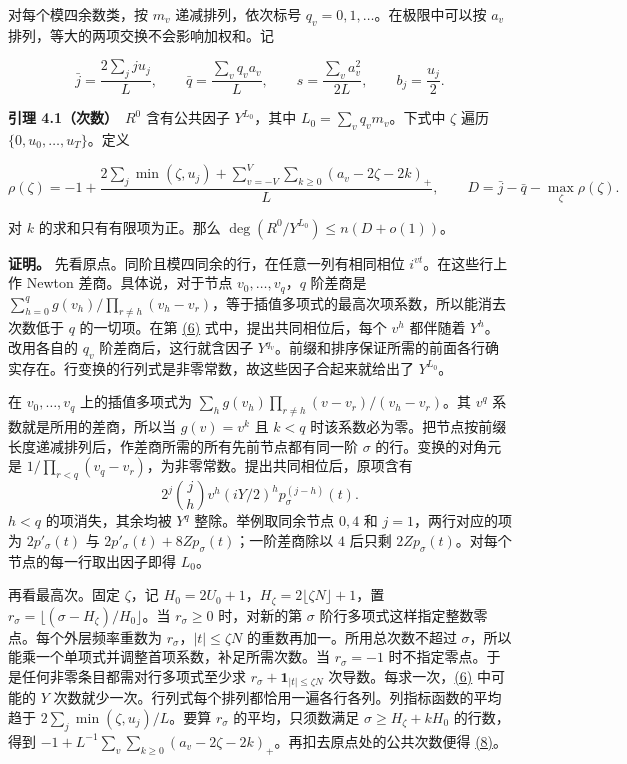 \documentclass[11pt,a4paper]{article}
\begin{document}
对每个模四余数类，按 \(m_v\) 递减排列，依次标号 \(q_v=0,1,\ldots\)。在极限中可以按 \(a_v\) 排列，等大的两项交换不会影响加权和。记

\[
 \bar j=\frac{2\sum_j ju_j}{L},\qquad \bar q=\frac{\sum_v q_va_v}{L},
 \qquad s=\frac{\sum_v a_v^2}{2L},\qquad b_j=\frac{u_j}{2}.                \tag{7}\label{eq:7}
\]

\textbf{引理 4.1（次数）}　\(R^0\) 含有公共因子 \(Y^{L_0}\)，其中 \(L_0=\sum_vq_vm_v\)。下式中 \(\zeta\) 遍历 \(\{0,u_0,\ldots,u_T\}\)。定义

\[
 \rho(\zeta)=-1+\frac{2\sum_j\min(\zeta,u_j)+
                   \sum_{v=-V}^{V}\sum_{k\ge0}(a_v-2\zeta-2k)_+}{L},
 \qquad D=\bar j-\bar q-\max_\zeta\rho(\zeta).                             \tag{8}\label{eq:8}
\]

对 \(k\) 的求和只有有限项为正。那么 \(\deg(R^0/Y^{L_0})\le n(D+o(1))\)。

\textbf{证明。} 先看原点。同阶且模四同余的行，在任意一列有相同相位 \(i^{vt}\)。在这些行上作 Newton 差商。具体说，对于节点 \(v_0,\ldots,v_q\)，\(q\) 阶差商是 \(\sum_{h=0}^qg(v_h)/\prod_{r\ne h}(v_h-v_r)\)，等于插值多项式的最高次项系数，所以能消去次数低于 \(q\) 的一切项。在第 \hyperref[eq:6]{(6)} 式中，提出共同相位后，每个 \(v^h\) 都伴随着 \(Y^h\)。改用各自的 \(q_v\) 阶差商后，这行就含因子 \(Y^{q_v}\)。前缀和排序保证所需的前面各行确实存在。行变换的行列式是非零常数，故这些因子合起来就给出了 \(Y^{L_0}\)。

在 \(v_0,\ldots,v_q\) 上的插值多项式为 \(\sum_h g(v_h)\prod_{r\ne h}(v-v_r)/(v_h-v_r)\)。其 \(v^q\) 系数就是所用的差商，所以当 \(g(v)=v^k\) 且 \(k<q\) 时该系数必为零。把节点按前缀长度递减排列后，作差商所需的所有先前节点都有同一阶 \(\sigma\) 的行。变换的对角元是 \(1/\prod_{r<q}(v_q-v_r)\)，为非零常数。提出共同相位后，原项含有 \[
 2^j\binom jh v^h(iY/2)^h p_\sigma^{(j-h)}(t).
\] \(h<q\) 的项消失，其余均被 \(Y^q\) 整除。举例取同余节点 \(0,4\) 和 \(j=1\)，两行对应的项为 \(2p'_\sigma(t)\) 与 \(2p'_\sigma(t)+8Zp_\sigma(t)\)；一阶差商除以 \(4\) 后只剩 \(2Zp_\sigma(t)\)。对每个节点的每一行取出因子即得 \(L_0\)。

再看最高次。固定 \(\zeta\)，记 \(H_0=2U_0+1\)，\(H_\zeta=2\lfloor\zeta N\rfloor+1\)，置 \(r_\sigma=\lfloor(\sigma-H_\zeta)/H_0\rfloor\)。当 \(r_\sigma\ge0\) 时，对新的第 \(\sigma\) 阶行多项式这样指定整数零点。每个外层频率重数为 \(r_\sigma\)，\(|t|\le\zeta N\) 的重数再加一。所用总次数不超过 \(\sigma\)，所以能乘一个单项式并调整首项系数，补足所需次数。当 \(r_\sigma=-1\) 时不指定零点。于是任何非零条目都需对行多项式至少求 \(r_\sigma+\mathbf1_{|t|\le\zeta N}\) 次导数。每求一次，\hyperref[eq:6]{(6)} 中可能的 \(Y\) 次数就少一次。行列式每个排列都恰用一遍各行各列。列指标函数的平均趋于 \(2\sum_j\min(\zeta,u_j)/L\)。要算 \(r_\sigma\) 的平均，只须数满足 \(\sigma\ge H_\zeta+kH_0\) 的行数，得到 \(-1+L^{-1}\sum_v\sum_{k\ge0}(a_v-2\zeta-2k)_+\)。再扣去原点处的公共次数便得 \hyperref[eq:8]{(8)}。
\end{document}
